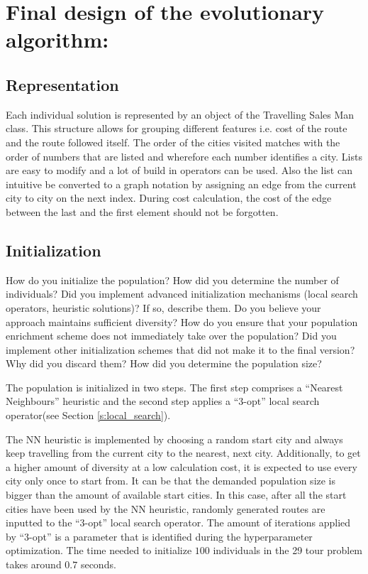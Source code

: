 \documentclass[a4paper,10pt]{article}
\newcommand{\ReplaceMe}[1]{{\color{blue}#1}}
\newcommand{\RemoveMe}[1]{{\color{purple}#1}}
\begin{document}
\section{Final design of the evolutionary algorithm:} 
%

\subsection{Representation}

Each individual solution is represented by an object of the Travelling Sales Man class. This structure allows for grouping different features i.e. cost of the route and the route followed itself. The order of the cities visited matches with the order of numbers that are listed and wherefore each number identifies a city.  Lists are easy to modify and a lot of build in operators can be used. Also the list can intuitive be converted to a graph notation by assigning an edge from the current city to city on the next index. During cost calculation, the cost of the edge between the last and the first element should not be forgotten.

\subsection{Initialization}

\ReplaceMe{How do you initialize the population? How did you determine the number of individuals? Did you implement advanced initialization mechanisms (local search operators, heuristic solutions)? If so, describe them. Do you believe your approach maintains sufficient diversity? How do you ensure that your population enrichment scheme does not immediately take over the population? Did you implement other initialization schemes that did not make it to the final version? Why did you discard them? How did you determine the population size?}

The population is initialized in two steps. The first step comprises a ``Nearest Neighbours'' heuristic and the second step applies a ``3-opt'' local search operator(see Section \ref{s:local_search}). 

The NN heuristic is implemented by choosing a random start city and always keep travelling from the current city to the nearest, next city. Additionally, to get a higher amount of diversity at a low calculation cost, it is expected to use every city only once to start from. It can be that the demanded population size is bigger than the amount of available start cities. In this case, after all the start cities have been used by the NN heuristic, randomly generated routes are inputted to the ``3-opt'' local search operator. The amount of iterations applied by ``3-opt'' is a parameter that is identified during the hyperparameter optimization. The time needed to initialize $100$ individuals in the 29 tour problem takes around $0.7$ seconds.\\
\end{document}
